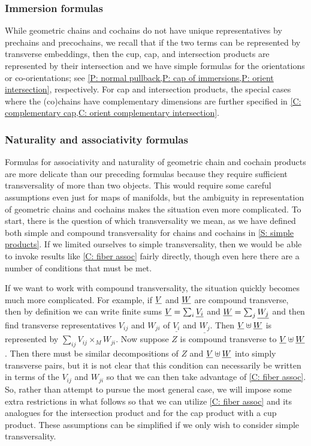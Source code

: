 \subsubsection{Immersion formulas}

While geometric chains and cochains do not have unique representatives by prechains and precochains, we recall that if the two terms can be represented by transverse embeddings, then the cup, cap, and intersection products are represented by their intersection and we have simple formulas for the orientations or co-orientations; see \cref{P: normal pullback,P: cap of immersions,P: orient intersection}, respectively.
For cap and intersection products, the special cases where the (co)chains have complementary dimensions are further specified in \cref{C: complementary cap,C: orient complementary intersection}.

\subsubsection{Naturality and associativity formulas}

Formulas for associativity and naturality of geometric chain and cochain products are more delicate than our preceding formulas because they require sufficient transversality of more than two objects.
This would require some careful assumptions even just for maps of manifolds, but the ambiguity in representation of geometric chains and cochains makes the situation even more complicated.
To start, there is the question of which transversality we mean, as we have defined both simple and compound transversality for chains and cochains in \cref{S: simple products}.
If we limited ourselves to simple transversality, then we would be able to invoke results like \cref{C: fiber assoc} fairly directly, though even here there are a number of conditions that must be met.

If we want to work with compound transversality, the situation quickly becomes much more complicated.
For example, if $\underline{V}$ and $\underline{W}$ are compound transverse, then by definition we can write finite sums $\underline{V} = \sum_i \underline{V_i}$ and $\underline{W} = \sum_j \underline{W_j}$ and then find transverse representatives $V_{ij}$ and $W_{ji}$ of $\underline{V_i}$ and $\underline{W_j}$.
Then $\underline{V}\uplus \underline{W}$ is represented by $\sum_{ij}V_{ij} \times_M W_{ji}.$
Now suppose $Z$ is compound transverse to $\underline{V}\uplus \underline{W}$.
Then there must be similar decompositions of $Z$ and $\underline{V}\uplus \underline{W}$ into simply transverse pairs, but it is not clear that this condition can necessarily be written in terms of the $V_{ij}$ and $W_{ji}$ so that we can then take advantage of \cref{C: fiber assoc}.
So, rather than attempt to pursue the most general case, we will impose some extra restrictions in what follows so that we can utilize \cref{C: fiber assoc} and its analogues for the intersection product and for the cap product with a cup product.
These assumptions can be simplified if we only wish to consider simple transversality.

